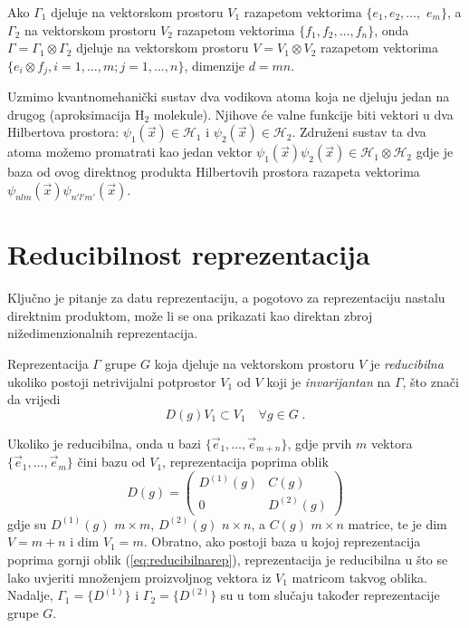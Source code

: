 Ako $\Gamma_1$ djeluje na vektorskom prostoru $V_1$ razapetom
vektorima $\{e_1, e_2, \ldots,$ $e_m\}$, a $\Gamma_2$ na vektorskom
prostoru $V_2$ razapetom vektorima $\{f_1, f_2, \ldots, f_n\}$,
onda $\Gamma=\Gamma_1 \otimes \Gamma_2$ djeluje na vektorskom
prostoru $V=V_1 \otimes V_2$ razapetom vektorima
$\{e_{i}\otimes f_{j}, i=1,\ldots, m; j=1,\ldots, n\}$,
dimenzije $d=mn$.

\begin{primjer}
Uzmimo kvantnomehanički sustav dva vodikova atoma koja ne djeluju jedan
na drugog (aproksimacija H$_2$ molekule). Njihove će valne funkcije 
biti vektori u dva Hilbertova prostora:
$\psi_{1}(\vec{x})\in \mathcal{H}_1$ i 
$\psi_{2}(\vec{x})\in \mathcal{H}_2$.
Združeni sustav ta dva atoma možemo promatrati kao jedan vektor
$\psi_{1}(\vec{x})\psi_{2}(\vec{x}) \in \mathcal{H}_1
\otimes \mathcal{H}_2$ gdje je baza od ovog direktnog
produkta Hilbertovih prostora razapeta vektorima
$\psi_{nlm}(\vec{x})\psi_{n'l'm'}(\vec{x})$.
\end{primjer}


\section{Reducibilnost reprezentacija}

Ključno je pitanje za datu reprezentaciju, a pogotovo za reprezentaciju
nastalu direktnim produktom, može li se ona prikazati kao direktan
zbroj nižedimenzionalnih reprezentacija. 
\begin{definicija}
Reprezentacija $\Gamma$ grupe $G$ koja djeluje na vektorskom
prostoru $V$  je \emph{reducibilna} ukoliko postoji netrivijalni
potprostor $V_{1}$ od $V$ koji je \emph{invarijantan} na $\Gamma$,
što znači da vrijedi
\begin{displaymath}
    D(g)V_{1}\subset V_{1} \quad \forall g \in G \;.
\end{displaymath}
\end{definicija}
Ukoliko je reducibilna,
onda u bazi $\{\vec{e}_1, \ldots, \vec{e}_{m+n} \}$, gdje prvih $m$
vektora $\{\vec{e}_1, \ldots, \vec{e}_{m} \}$ čini bazu od
$V_1$, reprezentacija poprima oblik
\begin{equation}
 D(g) = \begin{pmatrix}
  D^{(1)}(g) & C(g) \\
     0       & D^{(2)}(g) 
\end{pmatrix}
\label{eq:reducibilnarep}
\end{equation}
gdje su $D^{(1)}(g)$ $m\times m$, $D^{(2)}(g)$ $n\times n$,
a $C(g)$ $m\times n$ matrice, te je dim $V=m+n$ i dim $V_1=m$.
Obratno, ako postoji baza u kojoj reprezentacija poprima
gornji oblik (\ref{eq:reducibilnarep}), reprezentacija je reducibilna
u što se lako uvjeriti množenjem proizvoljnog vektora iz $V_1$ matricom
takvog oblika.
Nadalje, $\Gamma_1=\{D^{(1)}\}$ i $\Gamma_2=\{D^{(2)}\}$ su u tom
slučaju također reprezentacije grupe $G$.

